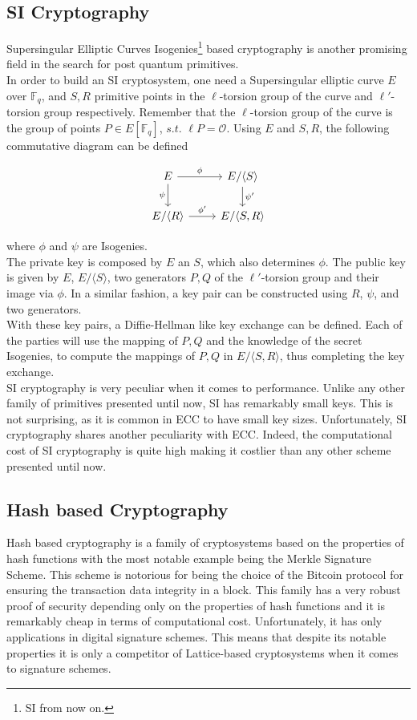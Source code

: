 \subsection{SI Cryptography}
Supersingular Elliptic Curves Isogenies\footnote{SI from now on.} based cryptography is another promising field in the search for post quantum primitives.\\
In order to build an SI cryptosystem, one need a Supersingular elliptic curve $E$ over $\mathbb{F}_q$, and $S,R$ primitive points in the $\ell$-torsion group of the curve and $\ell'$-torsion group respectively. Remember that the $\ell$-torsion group of the curve is the group of points $P\in E[\mathbb{F}_q]$, $s.t.$ $\ell P=\mathscr{O}$. Using $E$ and $S,R$, the following commutative diagram can be defined

\[\begin{tikzcd}
E \arrow{r}{\phi} \arrow[swap]{d}{\psi} & E/\langle S \rangle \arrow{d}{\psi'} \\
E/\langle R \rangle \arrow{r}{\phi'} & E/\langle S,R \rangle
\end{tikzcd}
\]

where $\phi$ and $\psi$ are Isogenies.\\
The private key is composed by $E$ an $S$, which also determines $\phi$. The public key is given by $E$, $E/\langle S \rangle$, two generators $P,Q$ of the $\ell'$-torsion group and their image via $\phi$. In a similar fashion, a key pair can be constructed using $R$, $\psi$, and two generators.\\
With these key pairs, a Diffie-Hellman like key exchange can be defined. Each of the parties will use the mapping of $P,Q$ and the knowledge of the secret Isogenies, to compute the mappings of $P,Q$ in $E/\langle S,R \rangle$, thus completing the key exchange.\\
SI cryptography is very peculiar when it comes to performance. Unlike any other family of primitives presented until now, SI has remarkably small keys. This is not surprising, as it is common in ECC to have small key sizes. Unfortunately, SI cryptography shares another peculiarity with ECC. Indeed, the computational cost of SI cryptography is quite high making it costlier than any other scheme presented until now. 

\subsection{Hash based Cryptography}
Hash based cryptography is a family of cryptosystems based on the properties of hash functions with the most notable example being the Merkle Signature Scheme. This scheme is notorious for being the choice of the Bitcoin protocol for ensuring the transaction data integrity in a block. This family has a very robust proof of security depending only on the properties of hash functions and it is remarkably cheap in terms of computational cost. Unfortunately, it has only applications in digital signature schemes. This means that despite its notable properties it is only a competitor of Lattice-based cryptosystems when it comes to signature schemes.